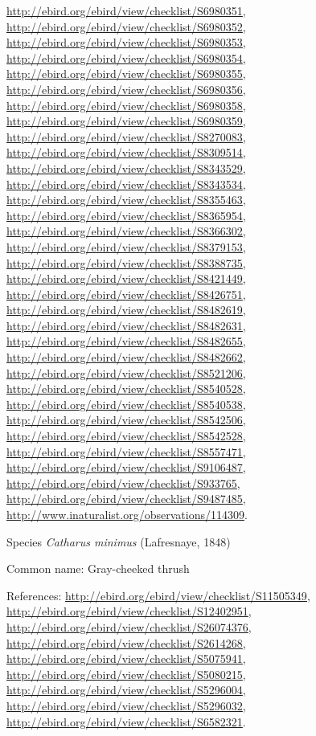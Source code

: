 \documentclass[9pt, article]{memoir}
\begin{document}
\begin{multicols}{2}
\url{http://ebird.org/ebird/view/checklist/S6980351}, 
\url{http://ebird.org/ebird/view/checklist/S6980352}, 
\url{http://ebird.org/ebird/view/checklist/S6980353}, 
\url{http://ebird.org/ebird/view/checklist/S6980354}, 
\url{http://ebird.org/ebird/view/checklist/S6980355}, 
\url{http://ebird.org/ebird/view/checklist/S6980356}, 
\url{http://ebird.org/ebird/view/checklist/S6980358}, 
\url{http://ebird.org/ebird/view/checklist/S6980359}, 
\url{http://ebird.org/ebird/view/checklist/S8270083}, 
\url{http://ebird.org/ebird/view/checklist/S8309514}, 
\url{http://ebird.org/ebird/view/checklist/S8343529}, 
\url{http://ebird.org/ebird/view/checklist/S8343534}, 
\url{http://ebird.org/ebird/view/checklist/S8355463}, 
\url{http://ebird.org/ebird/view/checklist/S8365954}, 
\url{http://ebird.org/ebird/view/checklist/S8366302}, 
\url{http://ebird.org/ebird/view/checklist/S8379153}, 
\url{http://ebird.org/ebird/view/checklist/S8388735}, 
\url{http://ebird.org/ebird/view/checklist/S8421449}, 
\url{http://ebird.org/ebird/view/checklist/S8426751}, 
\url{http://ebird.org/ebird/view/checklist/S8482619}, 
\url{http://ebird.org/ebird/view/checklist/S8482631}, 
\url{http://ebird.org/ebird/view/checklist/S8482655}, 
\url{http://ebird.org/ebird/view/checklist/S8482662}, 
\url{http://ebird.org/ebird/view/checklist/S8521206}, 
\url{http://ebird.org/ebird/view/checklist/S8540528}, 
\url{http://ebird.org/ebird/view/checklist/S8540538}, 
\url{http://ebird.org/ebird/view/checklist/S8542506}, 
\url{http://ebird.org/ebird/view/checklist/S8542528}, 
\url{http://ebird.org/ebird/view/checklist/S8557471}, 
\url{http://ebird.org/ebird/view/checklist/S9106487}, 
\url{http://ebird.org/ebird/view/checklist/S933765}, 
\url{http://ebird.org/ebird/view/checklist/S9487485}, 
\url{http://www.inaturalist.org/observations/114309}.

\vspace{6pt}\noindent\hspace{36pt}Species \textit{Catharus minimus} (Lafresnaye, 1848)


Common name: Gray-cheeked thrush

References: 
\url{http://ebird.org/ebird/view/checklist/S11505349}, 
\url{http://ebird.org/ebird/view/checklist/S12402951}, 
\url{http://ebird.org/ebird/view/checklist/S26074376}, 
\url{http://ebird.org/ebird/view/checklist/S2614268}, 
\url{http://ebird.org/ebird/view/checklist/S5075941}, 
\url{http://ebird.org/ebird/view/checklist/S5080215}, 
\url{http://ebird.org/ebird/view/checklist/S5296004}, 
\url{http://ebird.org/ebird/view/checklist/S5296032}, 
\url{http://ebird.org/ebird/view/checklist/S6582321}.


\end{multicols}
\end{document}
